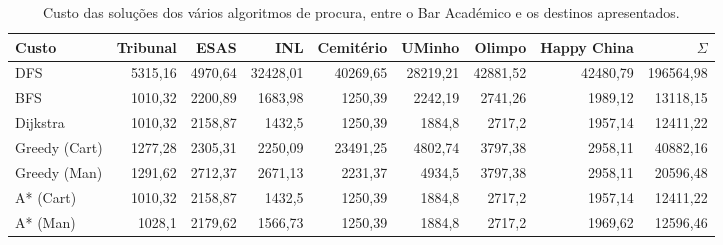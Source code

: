 \documentclass[12pt, a4paper, titlepage]{article}
\begin{document}
\begin{table}[H]
    \small

    \begin{adjustwidth}{-1.5cm}{-1.5cm}
        \begin{center}
            \begin{tabular}{|l|r|r|r|r|r|r|r|r|}
                \hline
                    Custo       &
                    Tribunal    &
                    ESAS        &
                    INL         &
                    Cemitério   &
                    UMinho      &
                    Olimpo      &
                    Happy China &
                    $\Sigma$    \\

                \hline
                DFS & 5315,16 & 4970,64 & 32428,01 & 40269,65 & 28219,21 & 42881,52 & 42480,79 & 196564,98 \\
                \hline
                BFS & 1010,32 & 2200,89 & 1683,98 & 1250,39 & 2242,19 & 2741,26 & 1989,12 & 13118,15 \\
                \hline
                Dijkstra & 1010,32 & 2158,87 & 1432,5 & 1250,39 & 1884,8 & 2717,2 & 1957,14 & 12411,22 \\
                \hline
                Greedy (Cart) & 1277,28 & 2305,31 & 2250,09 & 23491,25 & 4802,74 & 3797,38 & 2958,11 & 40882,16 \\
                \hline
                Greedy (Man) & 1291,62 & 2712,37 & 2671,13 & 2231,37 & 4934,5 & 3797,38 & 2958,11 & 20596,48 \\
                \hline
                A* (Cart) & 1010,32 & 2158,87 & 1432,5 & 1250,39 & 1884,8 & 2717,2 & 1957,14 & 12411,22 \\
                \hline
                A* (Man) & 1028,1 & 2179,62 & 1566,73 & 1250,39 & 1884,8 & 2717,2 & 1969,62 & 12596,46 \\
                \hline
            \end{tabular}
        \end{center}
    \end{adjustwidth}

    \caption{
        Custo das soluções dos vários algoritmos de procura, entre o Bar Académico e os destinos
        apresentados.
    }
\end{table}
\end{document}
